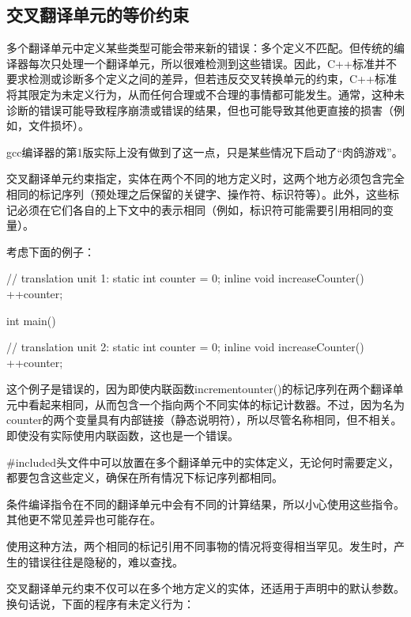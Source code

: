 \subsection{交叉翻译单元的等价约束}

多个翻译单元中定义某些类型可能会带来新的错误：多个定义不匹配。但传统的编译器每次只处理一个翻译单元，所以很难检测到这些错误。因此，C++标准并不要求检测或诊断多个定义之间的差异，但若违反交叉转换单元的约束，C++标准将其限定为未定义行为，从而任何合理或不合理的事情都可能发生。通常，这种未诊断的错误可能导致程序崩溃或错误的结果，但也可能导致其他更直接的损害（例如，文件损坏）。

\begin{notice}
gcc编译器的第1版实际上没有做到了这一点，只是某些情况下启动了“肉鸽游戏”。
\end{notice}

交叉翻译单元约束指定，实体在两个不同的地方定义时，这两个地方必须包含完全相同的标记序列（预处理之后保留的关键字、操作符、标识符等）。此外，这些标记必须在它们各自的上下文中的表示相同（例如，标识符可能需要引用相同的变量）。

考虑下面的例子：

\begin{cpp}
// translation unit 1:
static int counter = 0;
inline void increaseCounter()
{
	++counter;
}

int main()
{ }

// translation unit 2:
static int counter = 0;
inline void increaseCounter()
{
	++counter;
}
\end{cpp}

这个例子是错误的，因为即使内联函数incrementounter()的标记序列在两个翻译单元中看起来相同，从而包含一个指向两个不同实体的标记计数器。不过，因为名为counter的两个变量具有内部链接（静态说明符），所以尽管名称相同，但不相关。即使没有实际使用内联函数，这也是一个错误。

\#included头文件中可以放置在多个翻译单元中的实体定义，无论何时需要定义，都要包含这些定义，确保在所有情况下标记序列都相同。

\begin{notice}
条件编译指令在不同的翻译单元中会有不同的计算结果，所以小心使用这些指令。其他更不常见差异也可能存在。
\end{notice}

使用这种方法，两个相同的标记引用不同事物的情况将变得相当罕见。发生时，产生的错误往往是隐秘的，难以查找。

交叉翻译单元约束不仅可以在多个地方定义的实体，还适用于声明中的默认参数。换句话说，下面的程序有未定义行为：

